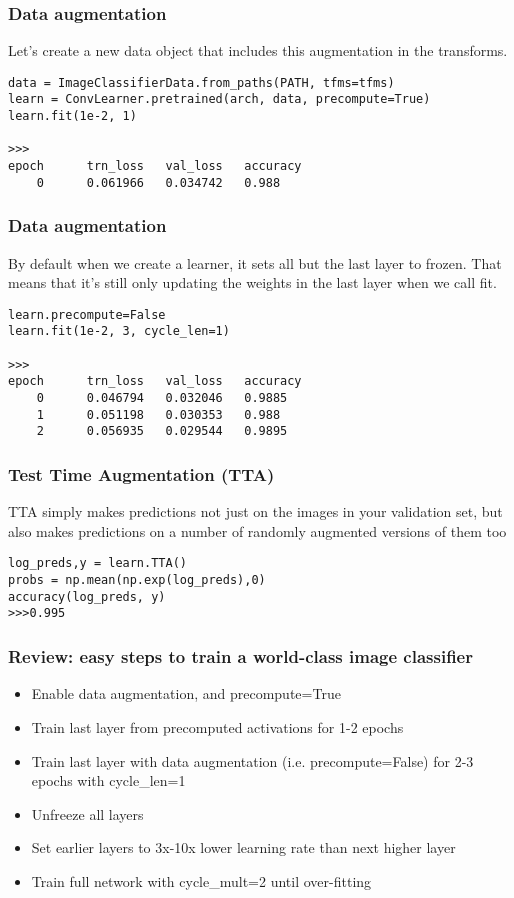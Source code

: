 \begin{frame}[fragile] \frametitle{Data augmentation}
Let's create a new data object that includes this augmentation in the transforms.
\begin{lstlisting}
data = ImageClassifierData.from_paths(PATH, tfms=tfms)
learn = ConvLearner.pretrained(arch, data, precompute=True)
learn.fit(1e-2, 1)

>>>
epoch      trn_loss   val_loss   accuracy   
    0      0.061966   0.034742   0.988 
\end{lstlisting}
\end{frame}

\begin{frame}[fragile] \frametitle{Data augmentation}
By default when we create a learner, it sets all but the last layer to frozen. That means that it's still only updating the weights in the last layer when we call fit.
\begin{lstlisting}
learn.precompute=False    
learn.fit(1e-2, 3, cycle_len=1)

>>>
epoch      trn_loss   val_loss   accuracy   
    0      0.046794   0.032046   0.9885 
    1      0.051198   0.030353   0.988
    2      0.056935   0.029544   0.9895    
\end{lstlisting}
\end{frame}


\begin{frame}[fragile] \frametitle{Test Time Augmentation (TTA)}
TTA simply makes predictions not just on the images in your validation set, but also makes predictions on a number of randomly augmented versions of them too
\begin{lstlisting}
log_preds,y = learn.TTA()
probs = np.mean(np.exp(log_preds),0)
accuracy(log_preds, y)
>>>0.995
\end{lstlisting}
\end{frame}

\begin{frame}[fragile] \frametitle{Review: easy steps to train a world-class image classifier}
\begin{itemize}
\item Enable data augmentation, and precompute=True
\item Train last layer from precomputed activations for 1-2 epochs
\item Train last layer with data augmentation (i.e. precompute=False) for 2-3 epochs with cycle\_len=1
\item Unfreeze all layers
\item Set earlier layers to 3x-10x lower learning rate than next higher layer
\item Train full network with cycle\_mult=2 until over-fitting
\end{itemize}

\end{frame}